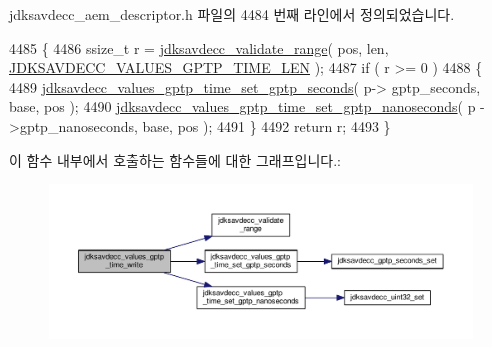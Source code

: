 jdksavdecc\+\_\+aem\+\_\+descriptor.\+h 파일의 4484 번째 라인에서 정의되었습니다.


\begin{DoxyCode}
4485 \{
4486     ssize\_t r = \hyperlink{group__util_ga9c02bdfe76c69163647c3196db7a73a1}{jdksavdecc\_validate\_range}( pos, len, 
      \hyperlink{group__values__gptp__time_ga78c1703ccda95c5b83f9cbcd68bcca08}{JDKSAVDECC\_VALUES\_GPTP\_TIME\_LEN} );
4487     \textcolor{keywordflow}{if} ( r >= 0 )
4488     \{
4489         \hyperlink{group__values__gptp__time_gabc65d638aef883cf8a750ab71f0fb955}{jdksavdecc\_values\_gptp\_time\_set\_gptp\_seconds}( p->
      gptp\_seconds, base, pos );
4490         \hyperlink{group__values__gptp__time_ga80754a9c52ece4c52f0dad6fb42d9040}{jdksavdecc\_values\_gptp\_time\_set\_gptp\_nanoseconds}( p
      ->gptp\_nanoseconds, base, pos );
4491     \}
4492     \textcolor{keywordflow}{return} r;
4493 \}
\end{DoxyCode}


이 함수 내부에서 호출하는 함수들에 대한 그래프입니다.\+:
\nopagebreak
\begin{figure}[H]
\begin{center}
\leavevmode
\includegraphics[width=350pt]{group__values__gptp__time_ga6111a486945e1650aecf9eb50ad7939d_cgraph}
\end{center}
\end{figure}



